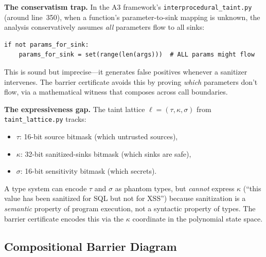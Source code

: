 \documentclass[11pt,a4paper]{article}
\theoremstyle{plain}
\theoremstyle{definition}
\theoremstyle{remark}
\begin{document}
\begin{whybarrier}
\textbf{The conservatism trap.}  In the A3 framework's
\texttt{interprocedural\_taint.py} (around line~350), when a function's
parameter-to-sink mapping is unknown, the analysis conservatively
assumes \emph{all} parameters flow to all sinks:

\begin{lstlisting}[style=python, numbers=none, frame=none,
  backgroundcolor=\color{red!5}]
if not params_for_sink:
    params_for_sink = set(range(len(args)))  # ALL params might flow
\end{lstlisting}

This is sound but imprecise---it generates false positives whenever a
sanitizer intervenes.  The barrier certificate avoids this by proving
\emph{which} parameters don't flow, via a mathematical witness that
composes across call boundaries.

\medskip\noindent
\textbf{The expressiveness gap.}  The taint lattice
$\ell = (\tau, \kappa, \sigma)$ from \texttt{taint\_lattice.py} tracks:
\begin{itemize}[nosep]
  \item $\tau$: 16-bit source bitmask (which untrusted sources),
  \item $\kappa$: 32-bit sanitized-sinks bitmask (which sinks are safe),
  \item $\sigma$: 16-bit sensitivity bitmask (which secrets).
\end{itemize}
A type system can encode $\tau$ and $\sigma$ as phantom types, but
\emph{cannot} express $\kappa$ (``this value has been sanitized for
SQL but not for XSS'') because sanitization is a \emph{semantic}
property of program execution, not a syntactic property of types.  The
barrier certificate encodes this via the $\kappa$ coordinate in the
polynomial state space.
\end{whybarrier}

\subsection{Compositional Barrier Diagram}
\end{document}
